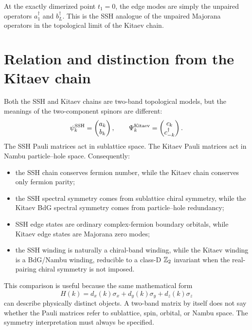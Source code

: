 At the exactly dimerized point $t_1=0$, the edge modes are simply the unpaired
operators $a_1^\dagger$ and $b_L^\dagger$.  This is the SSH analogue of the
unpaired Majorana operators in the topological limit of the Kitaev chain.

\section{Relation and distinction from the Kitaev chain}
\label{sec:ssh-relation-distinction-kitaev}

Both the SSH and Kitaev chains are two-band topological models, but the meanings
of the two-component spinors are different:
\begin{equation}
\label{eq:ssh-kitaev-spinor-comparison}
    \psi_k^{\rm SSH}
    =
    \begin{pmatrix}
        a_k\\ b_k
    \end{pmatrix},
    \qquad
    \Psi_k^{\rm Kitaev}
    =
    \begin{pmatrix}
        c_k\\ c_{-k}^\dagger
    \end{pmatrix}.
\end{equation}
The SSH Pauli matrices act in sublattice space.  The Kitaev Pauli matrices act in
Nambu particle--hole space.  Consequently:
\begin{itemize}[leftmargin=2.2em]
    \item the SSH chain conserves fermion number, while the Kitaev chain
    conserves only fermion parity;
    \item the SSH spectral symmetry comes from sublattice chiral symmetry,
    while the Kitaev BdG spectral symmetry comes from particle--hole redundancy;
    \item SSH edge states are ordinary complex-fermion boundary orbitals, while
    Kitaev edge states are Majorana zero modes;
    \item the SSH winding is naturally a chiral-band winding, while the Kitaev
    winding is a BdG/Nambu winding, reducible to a class-D $\mathbb{Z}_2$ invariant when
    the real-pairing chiral symmetry is not imposed.
\end{itemize}

This comparison is useful because the same mathematical form
\begin{equation}
\label{eq:ssh-kitaev-two-band-common-form}
    H(k)=d_x(k)\sigma_x+d_y(k)\sigma_y+d_z(k)\sigma_z
\end{equation}
can describe physically distinct objects.  A two-band matrix by itself does not
say whether the Pauli matrices refer to sublattice, spin, orbital, or Nambu
space.  The symmetry interpretation must always be specified.

